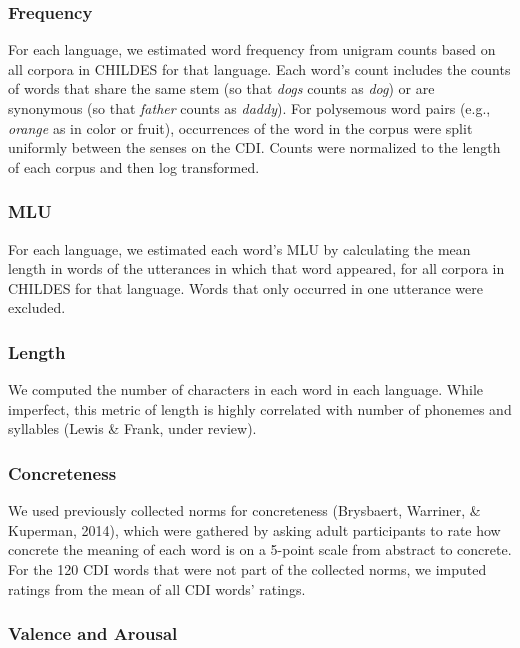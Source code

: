 \documentclass[10pt, letterpaper]{article}
\begin{document}
\subsubsection{Frequency}\label{frequency}

For each language, we estimated word frequency from unigram counts based
on all corpora in CHILDES for that language. Each word's count includes
the counts of words that share the same stem (so that \emph{dogs} counts
as \emph{dog}) or are synonymous (so that \emph{father} counts as
\emph{daddy}). For polysemous word pairs (e.g., \emph{orange} as in
color or fruit), occurrences of the word in the corpus were split
uniformly between the senses on the CDI. Counts were normalized to the
length of each corpus and then log transformed.

\subsubsection{MLU}\label{mlu}

For each language, we estimated each word's MLU by calculating the mean
length in words of the utterances in which that word appeared, for all
corpora in CHILDES for that language. Words that only occurred in one
utterance were excluded.

\subsubsection{Length}\label{length}

We computed the number of characters in each word in each language.
While imperfect, this metric of length is highly correlated with number
of phonemes and syllables (Lewis \& Frank, under review).

\subsubsection{Concreteness}\label{concreteness}

We used previously collected norms for concreteness (Brysbaert,
Warriner, \& Kuperman, 2014), which were gathered by asking adult
participants to rate how concrete the meaning of each word is on a
5-point scale from abstract to concrete. For the 120 CDI words that were
not part of the collected norms, we imputed ratings from the mean of all
CDI words' ratings.

\subsubsection{Valence and Arousal}\label{valence-and-arousal}
\end{document}
